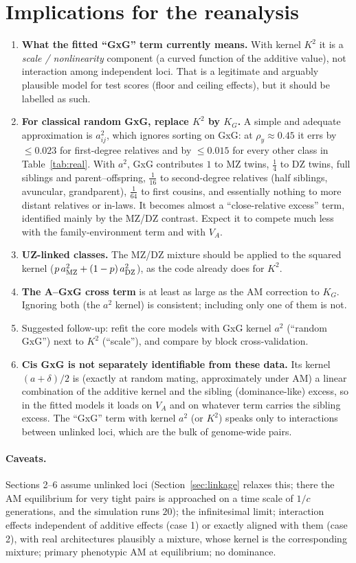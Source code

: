\documentclass[11pt]{article}
\begin{document}
\section{Implications for the reanalysis}
\begin{enumerate}
  \item \textbf{What the fitted ``GxG'' term currently means.} With kernel $K^2$ it is a \emph{scale /
    nonlinearity} component (a curved function of the additive value), not interaction among independent
    loci. That is a legitimate and arguably plausible model for test scores (floor and ceiling effects), but it
    should be labelled as such.
  \item \textbf{For classical random GxG, replace $K^2$ by $K_G$.} A simple and adequate approximation is
    $a_{ij}^2$, which ignores sorting on GxG: at $\rho_y\approx0.45$ it errs by $\le0.023$ for first-degree
    relatives and by $\le0.015$ for every other class in Table~\ref{tab:real}. With $a^2$, GxG contributes $1$ to MZ twins, $\tfrac14$ to DZ twins, full siblings and
    parent--offspring, $\tfrac1{16}$ to second-degree relatives (half siblings, avuncular, grandparent),
    $\tfrac1{64}$ to first cousins, and essentially nothing to more distant relatives or in-laws. It becomes almost a ``close-relative excess'' term, identified mainly by the MZ/DZ contrast.
    Expect it to compete much less with the family-environment term and with $V_A$.
  \item \textbf{UZ-linked classes.} The MZ/DZ mixture should be applied to the squared kernel
    ($p\,a_{\rm MZ}^2+(1-p)\,a_{\rm DZ}^2$), as the code already does for $K^2$.
  \item \textbf{The A--GxG cross term} is at least as large as the AM correction to $K_G$. Ignoring both (the
    $a^2$ kernel) is consistent; including only one of them is not.
  \item Suggested follow-up: refit the core models with GxG kernel $a^2$ (``random GxG'') next to $K^2$
    (``scale''), and compare by block cross-validation.
  \item \textbf{Cis GxG is not separately identifiable from these data.} Its kernel $(a+\delta)/2$ is (exactly at random mating, approximately under AM) a
    linear combination of the additive kernel and the sibling (dominance-like) excess, so in the fitted models it
    loads on $V_A$ and on whatever term carries the sibling excess. The ``GxG'' term with kernel $a^2$ (or
    $K^2$) speaks only to interactions between unlinked loci, which are the bulk of genome-wide pairs.
\end{enumerate}

\paragraph{Caveats.}
Sections 2--6 assume unlinked loci (Section~\ref{sec:linkage} relaxes this; there the AM equilibrium for
very tight pairs is approached on a time scale of $1/c$ generations, and the simulation runs $20$); the
infinitesimal limit; interaction effects independent of additive effects (case 1) or exactly aligned with them
(case 2), with real architectures plausibly a mixture, whose kernel is the corresponding mixture; primary
phenotypic AM at equilibrium; no dominance.
\end{document}
